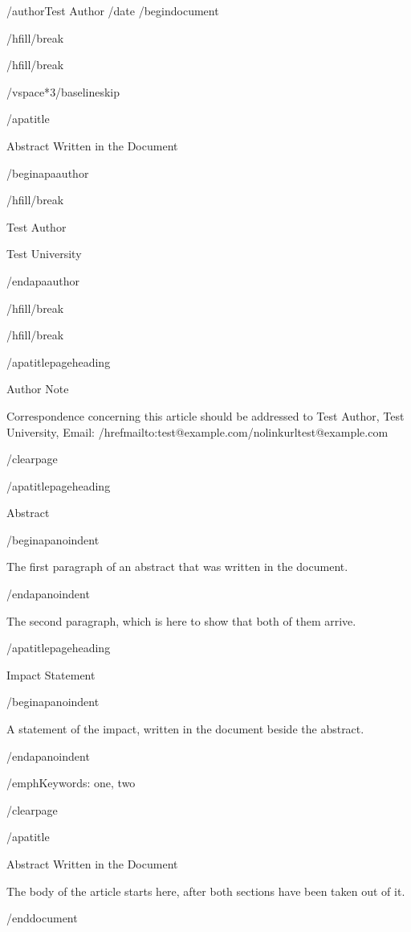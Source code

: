 /author{Test Author}
/date{}
/begin{document}


/hfill/break

/hfill/break

/vspace*{3/baselineskip}

/apatitle{

Abstract Written in the Document

}

/begin{apaauthor}

/hfill/break

Test Author

Test University

/end{apaauthor}

/hfill/break

/hfill/break

/apatitlepageheading{

Author Note

}

Correspondence concerning this article should be addressed to Test
Author, Test University, Email:
/href{mailto:test@example.com}{/nolinkurl{test@example.com}}

/clearpage

/apatitlepageheading{

Abstract

}

/begin{apanoindent}

The first paragraph of an abstract that was written in the document.

/end{apanoindent}

The second paragraph, which is here to show that both of them arrive.

/apatitlepageheading{

Impact Statement

}

/begin{apanoindent}

A statement of the impact, written in the document beside the abstract.

/end{apanoindent}

/emph{Keywords}: one, two

/clearpage

/apatitle{

Abstract Written in the Document

}

The body of the article starts here, after both sections have been taken
out of it.




/end{document}
